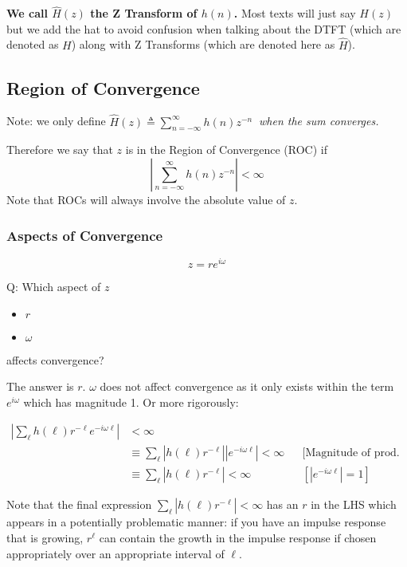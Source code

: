 \textbf{We call $\hat H(z)$ the Z Transform of $h(n)$.} Most texts will just say $H(z)$ but we add the hat to avoid confusion when talking about the DTFT (which are denoted as $H$) along with Z Transforms (which are denoted here as $\hat H$).

\subsection{Region of Convergence}
Note: we only define $\displaystyle\hat H(z)\triangleq\sum_{n=-\infty}^\infty h(n)z^{-n}\ $ \textit{when the sum converges.}

Therefore we say that $z$ is in the Region of Convergence (ROC) if
\[
    \left|\sum_{n=-\infty}^\infty h(n)z^{-n}\right| < \infty
\]
Note that ROCs will always involve the absolute value of $z$.

\subsubsection{Aspects of Convergence}
\[
    z=re^{i\omega}
\]
\begin{shaded}
Q: Which aspect of $z$
\begin{itemize}
    \item $r$
    \item $\omega$
\end{itemize}
affects convergence?
\end{shaded}

The answer is $r$. $\omega$ does not affect convergence as it only exists within the term $e^{i\omega}$ which has magnitude 1. Or more rigorously:

\begin{align*}
    \left|\sum_\ell h(\ell)r^{-\ell}e^{-i\omega\ell}\right|&<\infty
    \\
    &\equiv
    \sum_\ell \left|h(\ell)r^{-\ell}\right|\left|e^{-i\omega\ell}\right|
    <\infty
    &&\text{[Magnitude of prod. = prod. of the magnitudes]}
    \\
    &\equiv
    \sum_\ell \left|h(\ell)r^{-\ell}\right|
    <\infty
    &&\text{$\left[|e^{-i\omega\ell}|=1\right]$}
\end{align*}

Note that the final expression $\sum_\ell \left|h(\ell)r^{-\ell}\right|<\infty$ has an $r$ in the LHS which appears in a potentially problematic manner:
if you have an impulse response that is growing, $r^\ell$ can contain the growth in the impulse response if chosen appropriately over an appropriate interval of $\ell$.


